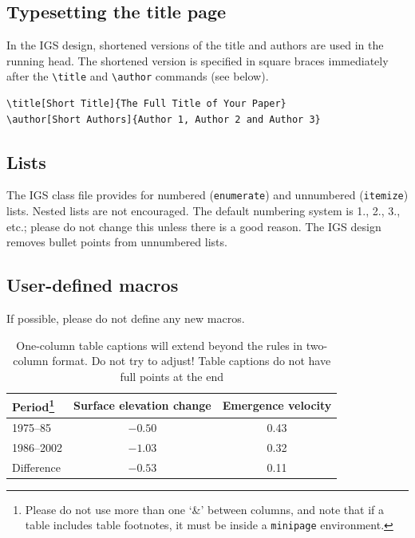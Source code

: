 \documentclass[review,jog]{igs}
\begin{document}
\subsection{Typesetting the title page}

In the IGS design, shortened versions of the title and authors are used in the running head. The shortened version is specified in square braces immediately after the \verb"\title" and \verb"\author" commands (see below). 

\begin{verbatim}
\title[Short Title]{The Full Title of Your Paper}
\author[Short Authors]{Author 1, Author 2 and Author 3}
\end{verbatim}

\subsection{Lists}
The IGS class file provides for numbered (\verb"enumerate") and unnumbered (\verb"itemize") lists. Nested lists are not encouraged. The default numbering system is 1., 2., 3., etc.; please do not change this unless there is a good reason. The IGS design removes bullet points from unnumbered lists.

\subsection{User-defined macros}
If possible, please do not define any new macros.

\begin{table}%
\caption{One-column table captions will extend beyond
  the rules in two-column format. Do not try to adjust!
  Table captions do not have full points at the end}
\label{period}
\begin{minipage}{86mm}%
\begin{tabular}{@{}lcc}\hline
Period\footnote{Please do not use more than one `\&' 
  between columns, and note that if a table includes 
  table footnotes, it must be inside a \texttt{minipage} 
  environment.}%
  & Surface elevation change
  & Emergence velocity\\ \hline
1975--85   & $-0.50$ & 0.43\\
1986--2002 & $-1.03$ & 0.32\\
Difference & $-0.53$ & \llap{$-$}0.11
\end{tabular}
\end{minipage}%
\end{table}
\end{document}
